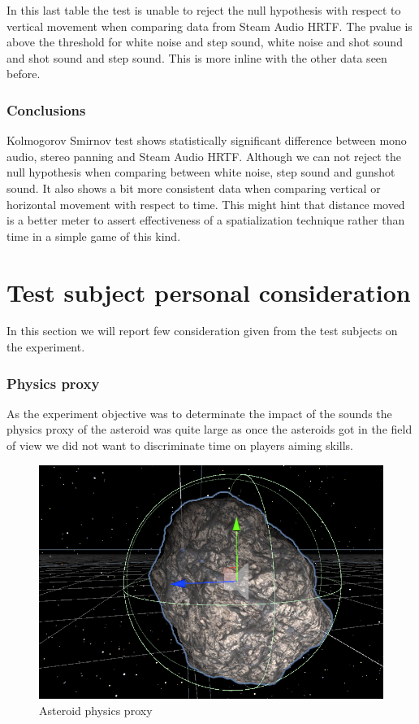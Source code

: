 \documentclass[conference]{IEEEtran}
\begin{document}
In this last table the test is unable to reject the null hypothesis with respect to vertical movement when comparing data from Steam Audio HRTF. The pvalue is above the threshold for white noise and step sound, white noise and shot sound and shot sound and step sound. This is more inline with the other data seen before.\\

\subsubsection{Conclusions}
Kolmogorov Smirnov test shows statistically significant difference between mono audio, stereo panning and Steam Audio HRTF. Although we can not reject the null hypothesis when comparing between white noise, step sound and gunshot sound. It also shows a bit more consistent data when comparing vertical or horizontal movement with respect to time. This might hint that distance moved is a better meter to assert effectiveness of a spatialization technique rather than time in a simple game of this kind.

\section{Test subject personal consideration}
In this section we will report few consideration given from the test subjects on the experiment.\\

\subsubsection{Physics proxy}
As the experiment objective was to determinate the impact of the sounds the physics proxy of the asteroid was quite large as once the asteroids got in the field of view we did not want to discriminate time on players aiming skills.
\begin{figure}[htbp]
\centerline{\includegraphics[scale=0.6]{hitbox.png}}
\caption{Asteroid physics proxy}
\label{fig12}
\end{figure}
\end{document}
